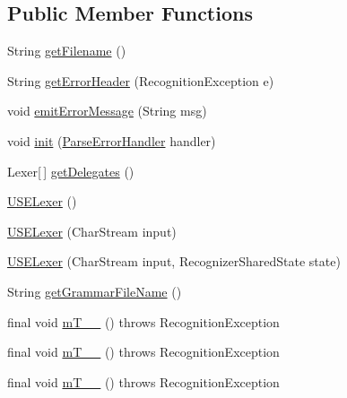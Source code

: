 \subsection*{Public Member Functions}
\begin{DoxyCompactItemize}
\item 
String \hyperlink{classorg_1_1tzi_1_1use_1_1parser_1_1use_1_1_u_s_e_lexer_acce71cc7bfeb7c066f2bd7fcf1cc5e41}{get\-Filename} ()
\item 
String \hyperlink{classorg_1_1tzi_1_1use_1_1parser_1_1use_1_1_u_s_e_lexer_ae9ffce92846c1e78d2f58e80f5f31030}{get\-Error\-Header} (Recognition\-Exception e)
\item 
void \hyperlink{classorg_1_1tzi_1_1use_1_1parser_1_1use_1_1_u_s_e_lexer_a0df10b9af7a0c729bcefbaa19a6fcde0}{emit\-Error\-Message} (String msg)
\item 
void \hyperlink{classorg_1_1tzi_1_1use_1_1parser_1_1use_1_1_u_s_e_lexer_a919241c3e11712ca2a13933e7f3df5e5}{init} (\hyperlink{classorg_1_1tzi_1_1use_1_1parser_1_1_parse_error_handler}{Parse\-Error\-Handler} handler)
\item 
Lexer\mbox{[}$\,$\mbox{]} \hyperlink{classorg_1_1tzi_1_1use_1_1parser_1_1use_1_1_u_s_e_lexer_adb7107c2bdabf85c153af41aba2f8b1a}{get\-Delegates} ()
\item 
\hyperlink{classorg_1_1tzi_1_1use_1_1parser_1_1use_1_1_u_s_e_lexer_a4c495fd2775350659e9db71bc432623b}{U\-S\-E\-Lexer} ()
\item 
\hyperlink{classorg_1_1tzi_1_1use_1_1parser_1_1use_1_1_u_s_e_lexer_a1948a2ce644e4b02b99792f780495df8}{U\-S\-E\-Lexer} (Char\-Stream input)
\item 
\hyperlink{classorg_1_1tzi_1_1use_1_1parser_1_1use_1_1_u_s_e_lexer_afaac3260ad658f81f442a05d79de1296}{U\-S\-E\-Lexer} (Char\-Stream input, Recognizer\-Shared\-State state)
\item 
String \hyperlink{classorg_1_1tzi_1_1use_1_1parser_1_1use_1_1_u_s_e_lexer_a236ad5cee27dbb8757fa35194bfc5544}{get\-Grammar\-File\-Name} ()
\item 
final void \hyperlink{classorg_1_1tzi_1_1use_1_1parser_1_1use_1_1_u_s_e_lexer_a59fe03d0056ae52054ea4974214de135}{m\-T\-\_\-\-\_} ()  throws Recognition\-Exception 
\item 
final void \hyperlink{classorg_1_1tzi_1_1use_1_1parser_1_1use_1_1_u_s_e_lexer_a67566f004091bfbe72b1e3a601327885}{m\-T\-\_\-\-\_} ()  throws Recognition\-Exception 
\item 
final void \hyperlink{classorg_1_1tzi_1_1use_1_1parser_1_1use_1_1_u_s_e_lexer_a353c794395de7168cff3e837cc2eb751}{m\-T\-\_\-\-\_} ()  throws Recognition\-Exception 

\end{DoxyCompactItemize}
